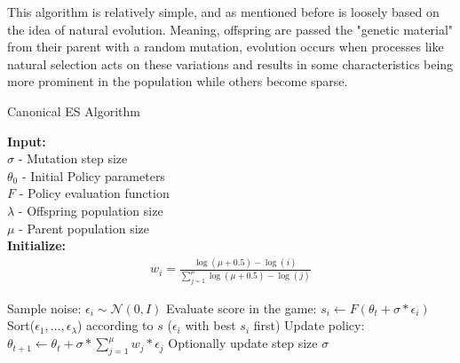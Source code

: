 \documentclass[11 pt, twocolumn]{article}
\begin{document}
This algorithm is relatively simple, and as mentioned before is loosely based on the idea of natural evolution. Meaning, offspring are passed the "genetic material" from their parent with a random mutation, evolution occurs when processes like natural selection acts on these variations and results in some characteristics being more prominent in the population while others become sparse.

\begin{algorithm}
\scriptsize
\caption{Canonical ES Algorithm}\label{alg_canonical}
\hspace*{\algorithmicindent} \textbf{Input:} \\
\hspace*{\algorithmicindent} $\sigma$ - Mutation step size\\
\hspace*{\algorithmicindent} $\theta_0$ - Initial Policy parameters\\
\hspace*{\algorithmicindent} $F$ - Policy evaluation function\\
\hspace*{\algorithmicindent} $\lambda$ - Offspring population size\\
\hspace*{\algorithmicindent} $\mu$ - Parent population size\\
\hspace*{\algorithmicindent} \textbf{Initialize:}
\begin{align*}
  &w_i=\frac{\log{(\mu + 0.5)}-\log{(i)}}{\sum_{j=1}^{\mu} \log{(\mu + 0.5)}-\log{(j)}}&
\end{align*}
\begin{algorithmic}[1]
      	\State Sample noise: $\epsilon_i \sim \mathcal{N}(0,I)$
      	\State Evaluate score in the game: $s_i \gets F(\theta_t+\sigma*\epsilon_i)$
      	\EndFor
      	\State Sort($\epsilon_1,\dots,\epsilon_\lambda$) according to $s$ ($\epsilon_i$ with best $s_i$ first)
      	\State Update policy: $\theta_{t+1} \gets \theta_t + \sigma * \sum_{j=1}^{\mu} w_j*\epsilon_j$
      	\State Optionally update step size $\sigma$
      \EndFor
\end{algorithmic}
\end{algorithm}
\end{document}
